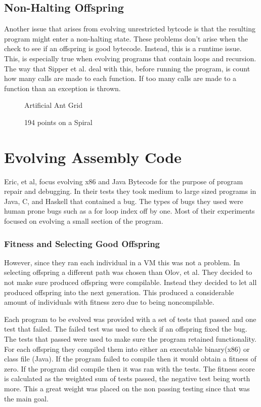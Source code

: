 \documentclass{sig-alternate}
\begin{document}
\subsection{Non-Halting Offspring}
Another issue that arises from evolving unrestricted bytcode is that the resulting program might enter a non-halting state. These problems don't arise when the check to see if an offspring is good bytecode. Instead, this is a runtime issue. This, is especially true when evolving programs that contain loops and recursion.
The way that Sipper et al.\cite{FINCH:2011} deal with this, before running the program, is count how many calls are made to each function. If too many calls are made to a function than an exception is thrown.


\begin{figure}
\centering
{}
\caption{Artificial Ant Grid}
\end{figure}

\begin{figure}
\centering
{}
\caption{194 points on a Spiral}
\end{figure}







\section{Evolving Assembly Code}
Eric, et al, focus evolving x86 and Java Bytecode for the purpose of program repair and debugging. In their tests they took medium to large sized programs in Java, C, and Haskell that contained a bug. The types of bugs they used were human prone bugs such as a for loop index off by one. Most of their experiments focused on evolving a small section of the program.
\subsubsection{Fitness and Selecting Good Offspring } 
However, since they ran each individual in a VM this was not a problem.  
In selecting offspring a different path was chosen than Olov, et al. They decided to not make sure produced offspring were compilable. Instead they decided to let all produced offspring into the next generation. This produced a considerable amount of individuals with fitness zero due to being noncompilable. 

Each program to be evolved was provided with a set of tests that passed and one test that failed. The failed test was used to check if an offspring fixed the bug. The tests that passed were used to make sure the program retained functionality. For each offspring they compiled them into either an executable binary(x86) or class file (Java). If the program failed to compile then it would obtain a fitness of zero. If the program did compile then it was ran with the tests. The fitness score is calculated as the weighted sum of tests passed, the negative test being worth more. This a great weight was placed on the non passing testing since that was the main goal.
\end{document}
